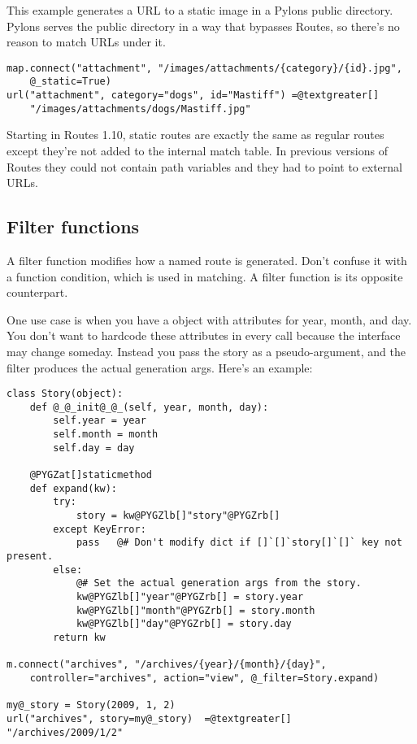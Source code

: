 \documentclass[letterpaper,10pt,english]{manual}
\begin{document}
This example generates a URL to a static image in a Pylons public directory.
Pylons serves the public directory in a way that bypasses Routes, so there's no
reason to match URLs under it.

\begin{Verbatim}[commandchars=@\[\]]
map.connect("attachment", "/images/attachments/{category}/{id}.jpg",
    @_static=True)
url("attachment", category="dogs", id="Mastiff") =@textgreater[]
    "/images/attachments/dogs/Mastiff.jpg"
\end{Verbatim}

Starting in Routes 1.10, static routes are exactly the same as regular routes
except they're not added to the internal match table.  In previous versions of
Routes they could not contain path variables and they had to point to external
URLs.


\subsection{Filter functions}

A filter function modifies how a named route is generated.  Don't confuse it
with a function condition, which is used in matching.  A filter function is its
opposite counterpart.

One use case is when you have a  object with attributes for year,
month, and day.  You don't want to hardcode these attributes in every 
call because the interface may change someday.  Instead you pass the story as a
pseudo-argument, and the filter produces the actual generation args.  Here's an
example:

\begin{Verbatim}[commandchars=@\[\]]
class Story(object):
    def @_@_init@_@_(self, year, month, day):
        self.year = year
        self.month = month
        self.day = day

    @PYGZat[]staticmethod
    def expand(kw):
        try:
            story = kw@PYGZlb[]"story"@PYGZrb[]
        except KeyError:
            pass   @# Don't modify dict if []`[]`story[]`[]` key not present.
        else:
            @# Set the actual generation args from the story.
            kw@PYGZlb[]"year"@PYGZrb[] = story.year
            kw@PYGZlb[]"month"@PYGZrb[] = story.month
            kw@PYGZlb[]"day"@PYGZrb[] = story.day
        return kw

m.connect("archives", "/archives/{year}/{month}/{day}",
    controller="archives", action="view", @_filter=Story.expand)

my@_story = Story(2009, 1, 2)
url("archives", story=my@_story)  =@textgreater[]  "/archives/2009/1/2"
\end{Verbatim}
\end{document}
